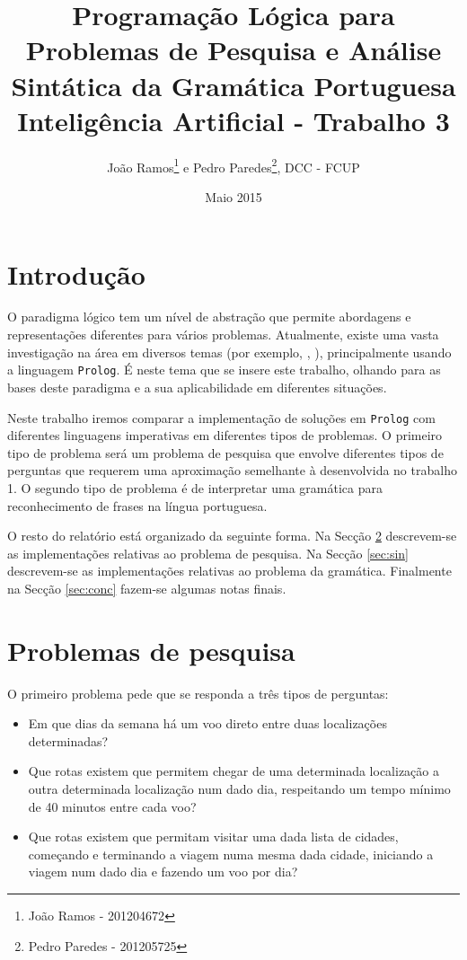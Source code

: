 \documentclass[12pt,a4paper,oneside]{article}
\title{Programação Lógica para Problemas de Pesquisa e Análise Sintática da Gramática Portuguesa\\
  \vspace{0.1in}
  \large{Inteligência Artificial - Trabalho 3}
}
\author{João Ramos\footnote{João Ramos - 201204672} e Pedro Paredes\footnote{Pedro Paredes - 201205725}, DCC - FCUP}
\date{Maio 2015}
\begin{document}
\maketitle


\section{Introdução}
\label{sec:intro}

O paradigma lógico tem um nível de abstração que permite abordagens e
representações diferentes para vários problemas. Atualmente, existe
uma vasta investigação na área em diversos temas (por exemplo,
\cite{costantini:2014}, \cite{komendantskaya:2014}), principalmente
usando a linguagem \texttt{Prolog}. É neste tema que se insere este
trabalho, olhando para as bases deste paradigma e a sua aplicabilidade
em diferentes situações.

Neste trabalho iremos comparar a implementação de soluções em
\texttt{Prolog} com diferentes linguagens imperativas em diferentes
tipos de problemas. O primeiro tipo de problema será um problema de
pesquisa que envolve diferentes tipos de perguntas que requerem uma
aproximação semelhante à desenvolvida no trabalho 1. O segundo tipo de
problema é de interpretar uma gramática para reconhecimento de frases
na língua portuguesa.

O resto do relatório está organizado da seguinte forma. Na Secção
\ref{sec:pes} descrevem-se as implementações relativas ao problema de
pesquisa. Na Secção \ref{sec:sin} descrevem-se as implementações
relativas ao problema da gramática. Finalmente na Secção
\ref{sec:conc} fazem-se algumas notas finais.


\section{Problemas de pesquisa}
\label{sec:pes}

O primeiro problema pede que se responda a três tipos de perguntas:

\begin{itemize}
\item Em que dias da semana há um voo direto entre duas localizações
  determinadas?
\item Que rotas existem que permitem chegar de uma determinada
  localização a outra determinada localização num dado dia,
  respeitando um tempo mínimo de 40 minutos entre cada voo?
\item Que rotas existem que permitam visitar uma dada lista de
  cidades, começando e terminando a viagem numa mesma dada cidade,
  iniciando a viagem num dado dia e fazendo um voo por dia?
\end{itemize}
\end{document}
